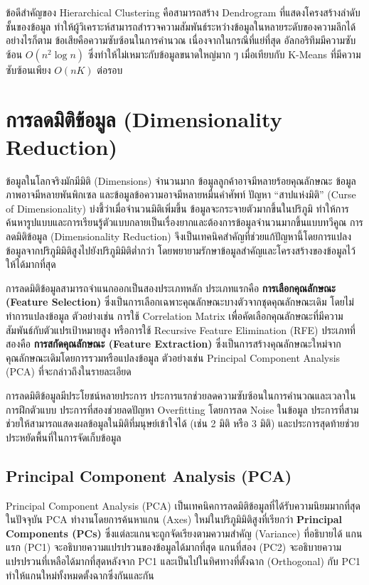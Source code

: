 ข้อดีสำคัญของ Hierarchical Clustering คือสามารถสร้าง Dendrogram ที่แสดงโครงสร้างลำดับชั้นของข้อมูล ทำให้ผู้วิเคราะห์สามารถสำรวจความสัมพันธ์ระหว่างข้อมูลในหลายระดับของความลึกได้ อย่างไรก็ตาม ข้อเสียคือความซับซ้อนในการคำนวณ เนื่องจากในกรณีที่แย่ที่สุด อัลกอริทึมมีความซับซ้อน $O(n^2 \log n)$ ซึ่งทำให้ไม่เหมาะกับข้อมูลขนาดใหญ่มาก ๆ เมื่อเทียบกับ K-Means ที่มีความซับซ้อนเพียง $O(nK)$ ต่อรอบ

\section{การลดมิติข้อมูล (Dimensionality Reduction)}

ข้อมูลในโลกจริงมักมีมิติ (Dimensions) จำนวนมาก ข้อมูลลูกค้าอาจมีหลายร้อยคุณลักษณะ ข้อมูลภาพอาจมีหลายพันพิกเซล และข้อมูลข้อความอาจมีหลายหมื่นคำศัพท์ ปัญหา ``สาปแห่งมิติ'' (Curse of Dimensionality) บ่งชี้ว่าเมื่อจำนวนมิติเพิ่มขึ้น ข้อมูลจะกระจายตัวมากขึ้นในปริภูมิ ทำให้การค้นหารูปแบบและการเรียนรู้ตัวแบบกลายเป็นเรื่องยากและต้องการข้อมูลจำนวนมากขึ้นแบบทวีคูณ การลดมิติข้อมูล (Dimensionality Reduction) จึงเป็นเทคนิคสำคัญที่ช่วยแก้ปัญหานี้โดยการแปลงข้อมูลจากปริภูมิมิติสูงไปยังปริภูมิมิติต่ำกว่า โดยพยายามรักษาข้อมูลสำคัญและโครงสร้างของข้อมูลไว้ให้ได้มากที่สุด

การลดมิติข้อมูลสามารถจำแนกออกเป็นสองประเภทหลัก ประเภทแรกคือ \textbf{การเลือกคุณลักษณะ (Feature Selection)} ซึ่งเป็นการเลือกเฉพาะคุณลักษณะบางตัวจากชุดคุณลักษณะเดิม โดยไม่ทำการแปลงข้อมูล ตัวอย่างเช่น การใช้ Correlation Matrix เพื่อคัดเลือกคุณลักษณะที่มีความสัมพันธ์กับตัวแปรเป้าหมายสูง หรือการใช้ Recursive Feature Elimination (RFE) ประเภทที่สองคือ \textbf{การสกัดคุณลักษณะ (Feature Extraction)} ซึ่งเป็นการสร้างคุณลักษณะใหม่จากคุณลักษณะเดิมโดยการรวมหรือแปลงข้อมูล ตัวอย่างเช่น Principal Component Analysis (PCA) ที่จะกล่าวถึงในรายละเอียด

การลดมิติข้อมูลมีประโยชน์หลายประการ ประการแรกช่วยลดความซับซ้อนในการคำนวณและเวลาในการฝึกตัวแบบ ประการที่สองช่วยลดปัญหา Overfitting โดยการลด Noise ในข้อมูล ประการที่สามช่วยให้สามารถแสดงผลข้อมูลในมิติที่มนุษย์เข้าใจได้ (เช่น 2 มิติ หรือ 3 มิติ) และประการสุดท้ายช่วยประหยัดพื้นที่ในการจัดเก็บข้อมูล

\subsection{Principal Component Analysis (PCA)}

Principal Component Analysis (PCA) เป็นเทคนิคการลดมิติข้อมูลที่ได้รับความนิยมมากที่สุดในปัจจุบัน PCA ทำงานโดยการค้นหาแกน (Axes) ใหม่ในปริภูมิมิติสูงที่เรียกว่า \textbf{Principal Components (PCs)} ซึ่งแต่ละแกนจะถูกจัดเรียงตามความสำคัญ (Variance) ที่อธิบายได้ แกนแรก (PC1) จะอธิบายความแปรปรวนของข้อมูลได้มากที่สุด แกนที่สอง (PC2) จะอธิบายความแปรปรวนที่เหลือได้มากที่สุดหลังจาก PC1 และเป็นไปในทิศทางที่ตั้งฉาก (Orthogonal) กับ PC1 ทำให้แกนใหม่ทั้งหมดตั้งฉากซึ่งกันและกัน

